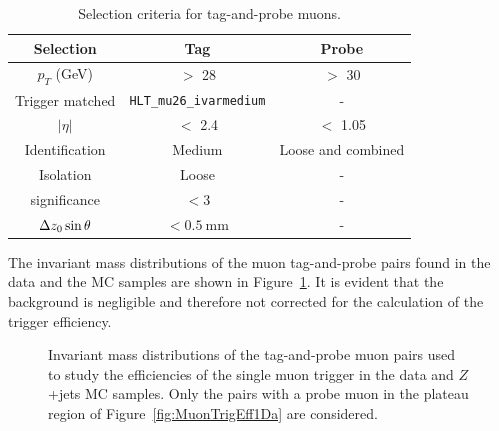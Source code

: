 \begin{table}[!htb]
	\centering
	\begin{tabular}{ccc}
		\hline
		\hline
		Selection           & Tag                               & Probe                     \\
		\hline
		$p_{T}$ (GeV)       & $>$ 28                            & $>$ 30                    \\
		Trigger matched     & \texttt{HLT\_mu26\_ivarmedium}    & -                         \\
		$|\eta|$            & $<$ 2.4                           & $<$ 1.05                  \\
		Identification      & Medium                            & Loose and combined        \\
		Isolation           & Loose                             & -                         \\
		\dzero significance & $< 3$                             & -                         \\
		$\Delta z_{0} \sin{\theta}$ & $< 0.5~\si{\mm}$         & -                         \\
		\hline
		\hline
	\end{tabular}
	\caption{Selection criteria for tag-and-probe muons.}
	\label{tab:ZmmSelection}
\end{table}

The invariant mass distributions of the muon tag-and-probe pairs found in the data and the MC samples are shown in Figure~\ref{fig:MuonTrigMass}. It is evident that the background is negligible and therefore not corrected for the calculation of the trigger efficiency.

\begin{figure}[!htb]
    \centering
    \caption{Invariant mass distributions of the tag-and-probe muon pairs used to study the efficiencies of the single muon trigger in the data and $Z$+jets MC samples. Only the pairs with a probe muon in the plateau region of Figure~\ref{fig:MuonTrigEff1Da} are considered.
    }
    \label{fig:MuonTrigMass}
\end{figure}

